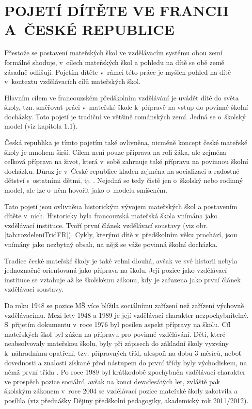 \chapter{POJETÍ DÍTĚTE VE FRANCII A~ČESKÉ REPUBLICE}

Přestože se postavení mateřských škol ve vzdělávacím systému obou zemí formálně shoduje, v~cílech mateřských škol a pohledu na dítě se obě země zásadně odlišují. Pojetím dítěte v~rámci této práce je myšlen pohled na dítě v~kontextu vzdělávacích cílů mateřských škol. 

Hlavním cílem ve francouzském předškolním vzdělávání je uvádět dítě do světa školy, tzn. směřovat práci v~mateřské škole k~přípravě na vstup do povinné školní docházky. Toto pojetí je tradiční ve většině románských zemí. Jedná se o~školský model (viz kapitola 1.1).

 Česká republika je tímto pojetím také ovlivněna, nicméně koncept české mateřské školy je mnohem širší. Cílem není pouze příprava na roli žáka, ale zejména celková příprava na život, která v~sobě zahrnuje také přípravu na povinnou školní docházku. Důraz je v~České republice kladen zejména na socializaci a radostné dětství s~ostatními dětmi, tj. . Nejedná se tedy čistě jen o~školský nebo rodinný model, ale lze o~něm hovořit jako o~modelu smíšeném. 

 Tato pojetí jsou ovlivněna historickým vývojem mateřských škol a postavením dítěte v~nich. Historicky byla francouzská mateřská škola vnímána jako vzdělávací instituce. Tvoří první článek vzdělávací soustavy (viz obr. \ref{tab:rozdeleniTridFR}). Cykly, kterými dítě v~předškolním věku prochází, jsou vnímány jako nezbytný obsah, na nějž se váže povinná školní docházka. 

Tradice české mateřské školy je také velmi dlouhá, avšak ve své historii nebyla jednoznačně orientovaná jako příprava na školu. Její pozice jako vzdělávací instituce se vztahuje až ke školskému zákonu, kdy je zařazena jako první článek vzdělávací soustavy. 

 Do roku 1948 se pozice MŠ více blížila sociálnímu zařízení než zařízení výchovně vzdělávacímu. Mezi lety 1948 a 1989 je její vzdělávací charakter nezpochybnitelný. S~přijetím dokumentu  v~roce 1976 byl posílen aspekt přípravy na školu. Cíl mateřských škol byl zúžen na přípravu pro povinné vzdělávání. Děti, které neabsolvovaly mateřskou školu, byly při zápisech do základní školy vyzvány k~náhradnímu opatření, tzv. přípravných tříd, alespoň na dobu 3 měsíců, neboť dovednosti a znalosti získané před nástupem do první třídy byly východiskem, na němž první třída . Po roce 1989 byl krátkodobě zpochybněn vzdělávací charakter ve prospěch pozice sociální, avšak na konci devadesátých let, zvláště pak školským zákonem v~roce 2004 se vzdělávací pozice mateřské školy zakotvila a posílila (viz přednášky Dějiny předškolní pedagogiky, akademický rok 2011/2012).

